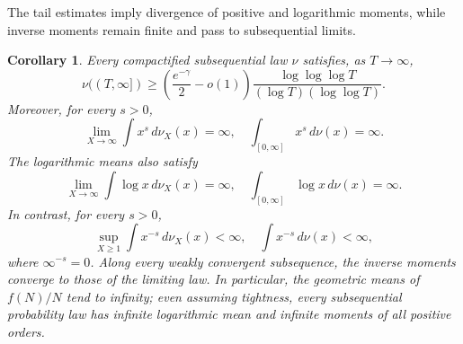 \documentclass[11pt,letterpaper,reqno]{amsart}
\numberwithin{equation}{section}
\newtheorem{corollary}[theorem]{Corollary}
\theoremstyle{remark}
\newcommand{\1}{\mathbf 1}
\renewcommand{\geq}{\geqslant}
\begin{document}
The tail estimates imply divergence of positive and logarithmic moments, while inverse moments remain finite and pass to subsequential limits.

\begin{corollary}
Every compactified subsequential law $\nu$ satisfies, as
$T\to\infty$,
\begin{equation}
\label{eq:dadd:subsequential-tail}
 \nu((T,\infty])
 \geq\left(\frac{e^{-\gamma}}2-o(1)\right)
 \frac{\log\log\log T}{(\log T)(\log\log T)}.
\end{equation}
Moreover, for every $s>0$,
\[
 \lim_{X\to\infty}\int x^s\,d\nu_X(x)=\infty,
 \quad
 \int_{[0,\infty]}x^s\,d\nu(x)=\infty.
\]
The logarithmic means also satisfy
\[
 \lim_{X\to\infty}\int\log x\,d\nu_X(x)=\infty,
 \quad
 \int_{[0,\infty]}\log x\,d\nu(x)=\infty.
\]
In contrast, for every $s>0$,
\[
 \sup_{X\geq1}\int x^{-s}\,d\nu_X(x)<\infty,
 \quad
 \int x^{-s}\,d\nu(x)<\infty,
\]
where $\infty^{-s}=0$. Along every weakly convergent subsequence,
the inverse moments converge to those of the limiting law.
In particular, the geometric means of $f(N)/N$ tend to infinity;
even assuming tightness, every subsequential probability law has
infinite logarithmic mean and infinite moments of all positive orders.
\end{corollary}
\end{document}
